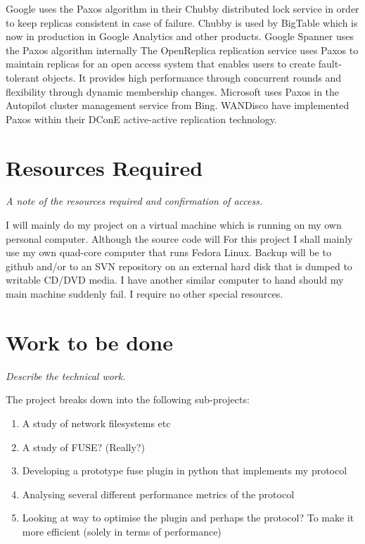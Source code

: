 Google uses the Paxos algorithm in their Chubby distributed lock service in order to keep
replicas consistent in case of failure. Chubby is used by BigTable which is now in production
in Google Analytics and other products.
Google Spanner uses the Paxos algorithm internally
The OpenReplica replication service uses Paxos to maintain replicas for an open access
system that enables users to create fault-tolerant objects. It provides high
performance through concurrent rounds and flexibility through dynamic membership
changes.
Microsoft uses Paxos in the Autopilot cluster management service from Bing.
WANDisco have implemented Paxos within their DConE active-active
replication technology.


\section*{Resources Required}

{\em A note of the resources required and confirmation of access.}

I will mainly do my project on a virtual machine which is running on my own personal computer.
Although the source code will
For this project I shall mainly use my own quad-core computer that runs Fedora Linux. Backup
will be to github and/or to an SVN repository on an external hard disk that is dumped to writable CD/DVD media.
I have another similar computer to hand should my main machine suddenly fail.
I require no other special resources.

\section*{Work to be done}

{\em Describe the technical work.}

The project breaks down into the following sub-projects:

\begin{enumerate}

\item A study of network filesystems etc

\item A study of FUSE? (Really?)

\item Developing a prototype fuse plugin in python that implements my protocol

\item Analysing several different performance metrics of the protocol

\item Looking at way to optimise the plugin and perhaps the protocol? To make it more efficient
(solely in terms of performance)

\end{enumerate}

